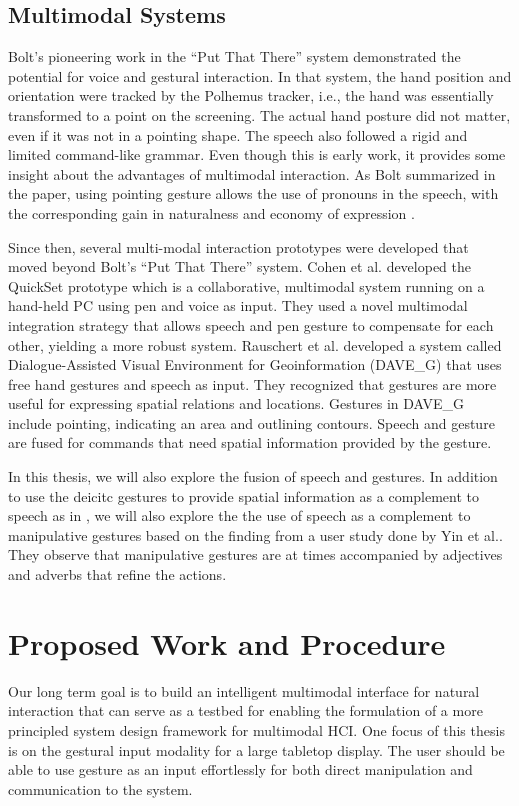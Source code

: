 \subsection{Multimodal Systems}
Bolt's pioneering work in the ``Put That There'' system \cite{Bolt80} 
demonstrated the potential for voice and gestural interaction.  In that system, 
the hand position and orientation were tracked by the Polhemus tracker, i.e.,
the hand was essentially transformed to a point on the screening. The actual hand 
posture did not matter, even if it was not in a pointing shape. The speech also 
followed a rigid and limited command-like grammar. Even though this is early 
work, it provides some insight about the advantages of multimodal interaction. 
As Bolt summarized in the paper, using pointing gesture allows the use of 
pronouns in the speech, with the corresponding gain in naturalness and economy 
of expression \cite{Bolt80}.

Since then, several multi-modal interaction prototypes were 
developed that moved beyond Bolt's ``Put That There'' system. Cohen et al. 
\cite{Cohen97} developed the QuickSet prototype which is a collaborative, 
multimodal system running on a hand-held PC using pen and voice as input. They 
used a novel multimodal integration strategy that allows speech and pen gesture 
to compensate for each other, yielding a more robust system. Rauschert et al. 
\cite{Rauschert02} developed a system called Dialogue-Assisted Visual 
Environment for Geoinformation (DAVE\_G) that uses free hand gestures and speech
as input. They recognized that gestures are more useful for expressing spatial 
relations and locations. Gestures in DAVE\_G include pointing, indicating an 
area and outlining contours. Speech and gesture are fused for commands that need
spatial information provided by the gesture. 

In this thesis, we will also explore the fusion of speech and gestures. In
addition to use the deicitc gestures to provide spatial information as a complement to
speech as in \cite{Rauschert02}, we will also explore the the use of speech as a
complement to manipulative gestures based on the finding from a user study done
by Yin et al.\cite{yin10}. They observe that manipulative gestures are at times
accompanied by adjectives and adverbs that refine the actions.

\section{Proposed Work and Procedure}
Our long term goal is to build an intelligent multimodal interface for natural
interaction that can serve as a testbed for enabling the formulation of a more
principled system design framework for multimodal HCI. One focus of this thesis
is on the gestural input modality for a large tabletop display. The user should
be able to use gesture as an input effortlessly for both direct manipulation and communication to the system.

